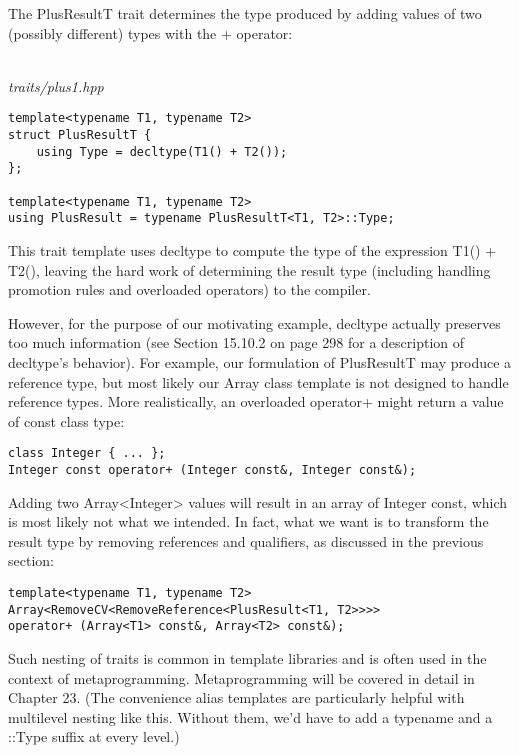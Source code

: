 The PlusResultT trait determines the type produced by adding values of two (possibly different) types with the + operator:

\hspace*{\fill} \\ %
\noindent
\textit{traits/plus1.hpp}
\begin{lstlisting}[style=styleCXX]
template<typename T1, typename T2>
struct PlusResultT {
	using Type = decltype(T1() + T2());
};

template<typename T1, typename T2>
using PlusResult = typename PlusResultT<T1, T2>::Type;
\end{lstlisting}

This trait template uses decltype to compute the type of the expression T1() + T2(), leaving the hard work of determining the result type (including handling promotion rules and overloaded operators) to the compiler.

However, for the purpose of our motivating example, decltype actually preserves too much information (see Section 15.10.2 on page 298 for a description of decltype’s behavior). For example, our formulation of PlusResultT may produce a reference type, but most likely our Array class template is not designed to handle reference types. More realistically, an overloaded operator+ might return a value of const class type:

\begin{lstlisting}[style=styleCXX]
class Integer { ... };
Integer const operator+ (Integer const&, Integer const&);
\end{lstlisting}

Adding two Array<Integer> values will result in an array of Integer const, which is most likely not what we intended. In fact, what we want is to transform the result type by removing references and qualifiers, as discussed in the previous section:

\begin{lstlisting}[style=styleCXX]
template<typename T1, typename T2>
Array<RemoveCV<RemoveReference<PlusResult<T1, T2>>>>
operator+ (Array<T1> const&, Array<T2> const&);
\end{lstlisting}

Such nesting of traits is common in template libraries and is often used in the context of metaprogramming. Metaprogramming will be covered in detail in Chapter 23. (The convenience alias templates are particularly helpful with multilevel nesting like this. Without them, we’d have to add a typename and a ::Type suffix at every level.)

